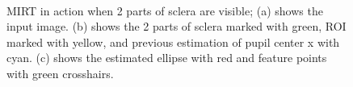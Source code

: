 \documentclass[12pt,fleqn]{book} %
\begin{document}
\begin{figure}[h]
\begin{dBox}
	\mbox{
	\centering
	}
   \caption{MIRT in action when 2 parts of sclera are visible; (a) shows the input image. (b) shows the 2 parts of sclera marked with green, ROI marked with yellow, and previous estimation of pupil center x with cyan. (c) shows the estimated ellipse with red and feature points with green crosshairs. \label{fig:mirt_2p} }      
\end{dBox}   
\end{figure}
\end{document}
